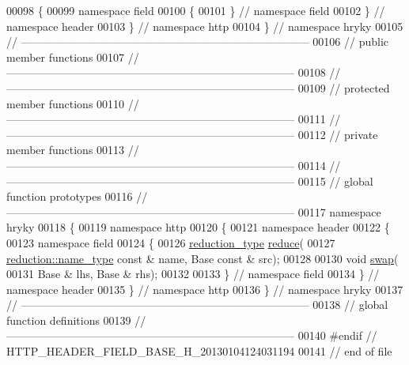 \begin{DoxyCode}
00098 \{
00099 \textcolor{keyword}{namespace }field
00100 \{
00101 \} \textcolor{comment}{// namespace field}
00102 \} \textcolor{comment}{// namespace header}
00103 \} \textcolor{comment}{// namespace http}
00104 \} \textcolor{comment}{// namespace hryky}
00105 \textcolor{comment}{//
      ------------------------------------------------------------------------------}
00106 \textcolor{comment}{// public member functions}
00107 \textcolor{comment}{//
      ------------------------------------------------------------------------------}
00108 \textcolor{comment}{//
      ------------------------------------------------------------------------------}
00109 \textcolor{comment}{// protected member functions}
00110 \textcolor{comment}{//
      ------------------------------------------------------------------------------}
00111 \textcolor{comment}{//
      ------------------------------------------------------------------------------}
00112 \textcolor{comment}{// private member functions}
00113 \textcolor{comment}{//
      ------------------------------------------------------------------------------}
00114 \textcolor{comment}{//
      ------------------------------------------------------------------------------}
00115 \textcolor{comment}{// global function prototypes}
00116 \textcolor{comment}{//
      ------------------------------------------------------------------------------}
00117 \textcolor{keyword}{namespace }hryky
00118 \{
00119 \textcolor{keyword}{namespace }http
00120 \{
00121 \textcolor{keyword}{namespace }header
00122 \{
00123 \textcolor{keyword}{namespace }field
00124 \{
00126     \hyperlink{namespacehryky_a343a9a4c36a586be5c2693156200eadc}{reduction_type} \hyperlink{namespacehryky_1_1http_a08fc36a78a8e2908140fcd102829a566}{reduce}(
00127         \hyperlink{namespacehryky_1_1reduction_ac686c30a4c8d196bbd0f05629a6b921f}{reduction::name_type} \textcolor{keyword}{const} & name, Base \textcolor{keyword}{const} & src);
00128 
00130     \textcolor{keywordtype}{void} \hyperlink{namespacehryky_1_1http_a38e62595ad532d18fbc65ceb61973aec}{swap}(
00131         Base & lhs, Base & rhs);
00132 
00133 \} \textcolor{comment}{// namespace field}
00134 \} \textcolor{comment}{// namespace header}
00135 \} \textcolor{comment}{// namespace http}
00136 \} \textcolor{comment}{// namespace hryky}
00137 \textcolor{comment}{//
      ------------------------------------------------------------------------------}
00138 \textcolor{comment}{// global function definitions}
00139 \textcolor{comment}{//
      ------------------------------------------------------------------------------}
00140 \textcolor{preprocessor}{#endif // HTTP\_HEADER\_FIELD\_BASE\_H\_20130104124031194}
00141 \textcolor{preprocessor}{}\textcolor{comment}{// end of file}
\end{DoxyCode}
